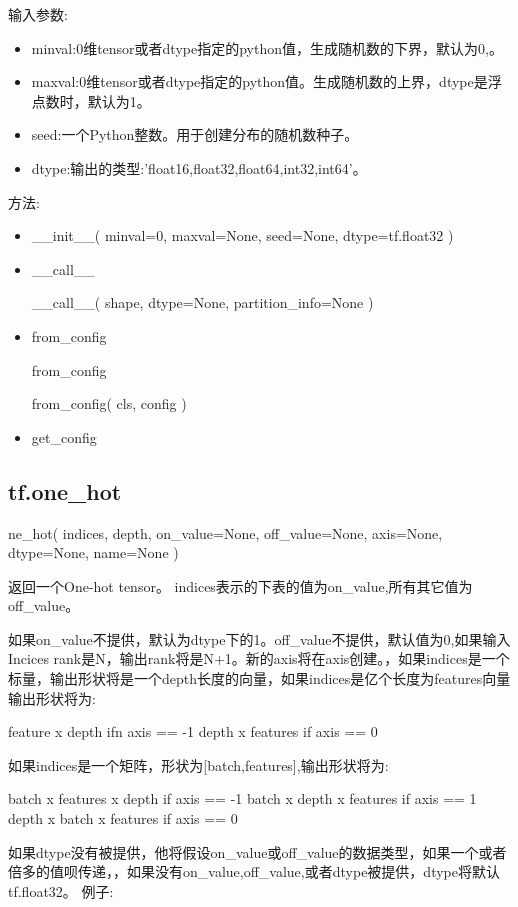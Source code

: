 输入参数:
\begin{itemize}
\item minval:0维tensor或者dtype指定的python值，生成随机数的下界，默认为0,。
\item maxval:0维tensor或者dtype指定的python值。生成随机数的上界，dtype是浮点数时，默认为1。
\item seed:一个Python整数。用于创建分布的随机数种子。
\item dtype:输出的类型:'float16,float32,float64,int32,int64'。
\end{itemize}
方法:
\begin{itemize}
\item \begin{python}__init__(
    minval=0,
    maxval=None,
    seed=None,
    dtype=tf.float32
)\end{python}
\item \_\_call\_\_
\begin{python}
__call__(
    shape,
    dtype=None,
    partition_info=None
)
\end{python}
\item from\_config
\begin{python}
from_config

from_config(
    cls,
    config
)
\end{python}
\item get\_config
\end{itemize}
\subsection{tf.one\_hot}
\begin{python}
ne_hot(
    indices,
    depth,
    on_value=None,
    off_value=None,
    axis=None,
    dtype=None,
    name=None
)
\end{python}
返回一个One-hot tensor。
indices表示的下表的值为on\_value,所有其它值为off\_value。

如果on\_value不提供，默认为dtype下的1。off\_value不提供，默认值为0,如果输入Incices rank是N，输出rank将是N+1。新的axis将在axis创建。，如果indices是一个标量，输出形状将是一个depth长度的向量，如果indices是亿个长度为features向量输出形状将为:
\begin{python}
feature x depth ifn axis == -1
depth x features if axis == 0
\end{python}
如果indices是一个矩阵，形状为[batch,features],输出形状将为:
\begin{python}
 batch x features x depth if axis == -1
  batch x depth x features if axis == 1
  depth x batch x features if axis == 0
\end{python}
如果dtype没有被提供，他将假设on\_value或off\_value的数据类型，如果一个或者倍多的值呗传递，，如果没有on\_value,off\_value,或者dtype被提供，dtype将默认tf.float32。
例子:

